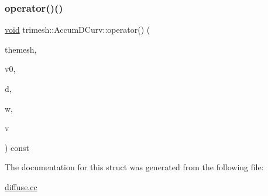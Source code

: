 \subsubsection{\texorpdfstring{operator()()}{operator()()}}
{\footnotesize\ttfamily \hyperlink{namespacetrimesh_a784ddfd979e1c579bda795a8edfc3f43}{void} trimesh\+::\+Accum\+D\+Curv\+::operator() (\begin{DoxyParamCaption}\item[{const \hyperlink{classtrimesh_1_1TriMesh}{Tri\+Mesh} $\ast$}]{themesh,  }\item[{int}]{v0,  }\item[{\hyperlink{classtrimesh_1_1Vec}{Vec}$<$ 4 $>$ \&}]{d,  }\item[{float}]{w,  }\item[{int}]{v }\end{DoxyParamCaption}) const\hspace{0.3cm}{\ttfamily [inline]}}



The documentation for this struct was generated from the following file\+:\begin{DoxyCompactItemize}
\item 
\hyperlink{diffuse_8cc}{diffuse.\+cc}\end{DoxyCompactItemize}

